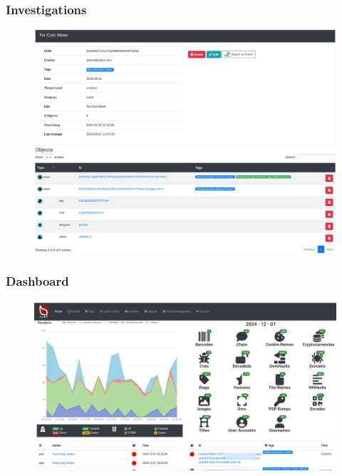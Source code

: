 \documentclass[aspectratio=169]{beamer}
\begin{document}
\begin{frame}
    \frametitle{Investigations}
    \begin{figure}
        \includegraphics[scale=0.22, angle=0]{screenshot/investigation_mixer.png}
    \end{figure}
\end{frame}



\begin{frame}
    \frametitle{Dashboard}
    \begin{figure}
        \includegraphics[scale=0.18, angle=0]{screenshot/dashboard.jpeg}
    \end{figure}
\end{frame}
\end{document}
